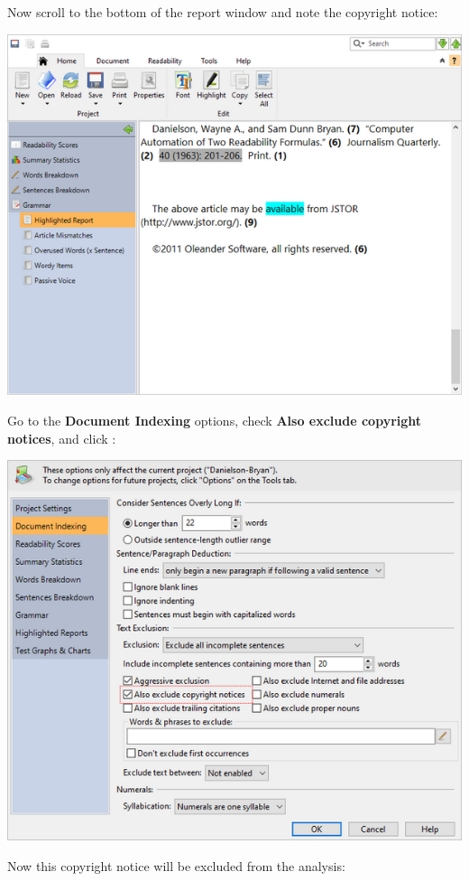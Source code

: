 \documentclass[
]{book}
\theoremstyle{definition}
\theoremstyle{definition}
\theoremstyle{definition}
\theoremstyle{definition}
\theoremstyle{remark}
\begin{document}
Now scroll to the bottom of the report window and note the copyright notice:

\includegraphics{Images/ExclusionExampleCopyrightIncluded.png}

Go to the \textbf{Document Indexing} options, check \textbf{Also exclude copyright notices}, and click :

\includegraphics{Images/ExclusionExampleCopyrightExcluded.png}

Now this copyright notice will be excluded from the analysis:
\end{document}
